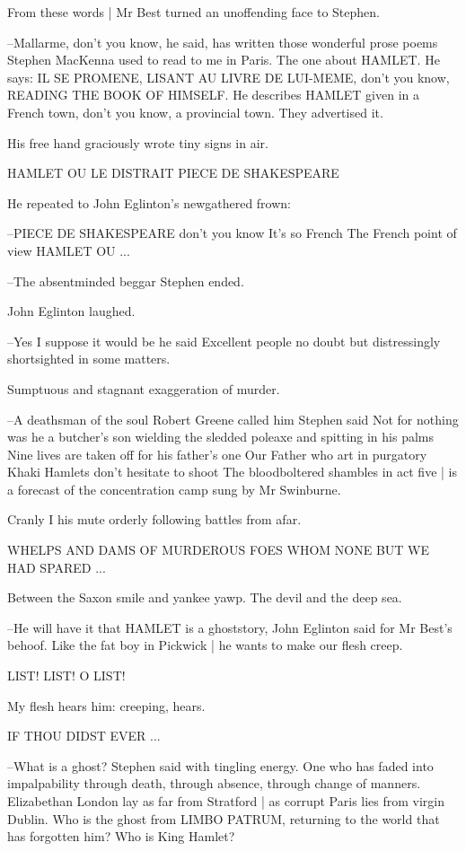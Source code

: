 From these words |
Mr Best turned an unoffending face to Stephen.

--Mallarme,
don't you know,
he said,
has written those wonderful prose poems
Stephen MacKenna used to read to me in Paris.
The one about HAMLET.
He says:
IL SE PROMENE,
LISANT AU LIVRE DE LUI-MEME,
don't you know,
READING THE BOOK OF HIMSELF.
He describes HAMLET given in a French town,
don't you know,
a provincial town.
They advertised it.

His free hand graciously wrote tiny signs in air.


    HAMLET
    OU
    LE DISTRAIT
    PIECE DE SHAKESPEARE


He repeated to John Eglinton's newgathered frown:

--PIECE DE SHAKESPEARE
don't you know
It's so French
The French point of view
HAMLET OU ...

--The absentminded beggar
Stephen ended.

John Eglinton laughed.

--Yes
I suppose it would be
he said
Excellent people
no doubt
but distressingly shortsighted in some matters.

Sumptuous and stagnant exaggeration of murder.

--A deathsman of the soul Robert Greene called him
Stephen said
Not for nothing was he a butcher's son
wielding the sledded poleaxe and spitting in his palms
Nine lives are taken off for his father's one
Our Father who art in purgatory
Khaki Hamlets don't hesitate to shoot
The bloodboltered shambles in act five |
is a forecast of the concentration camp sung by Mr Swinburne.

Cranly
I his mute orderly
following battles from afar.

    WHELPS AND DAMS OF MURDEROUS FOES WHOM NONE
    BUT WE HAD SPARED ...


Between the Saxon smile and yankee yawp.
The devil and the deep sea.

--He will have it that HAMLET is a ghoststory,
John Eglinton said for Mr Best's behoof.
Like the fat boy in Pickwick |
he wants to make our flesh creep.


    LIST! LIST! O LIST!


My flesh hears him:
creeping, hears.


    IF THOU DIDST EVER ...


--What is a ghost?
Stephen said with tingling energy.
One who has faded into impalpability through death,
through absence,
through change of manners.
Elizabethan London lay as far from Stratford |
as corrupt Paris lies from virgin Dublin.
Who is the ghost from LIMBO PATRUM,
returning to the world that has forgotten him?
Who is King Hamlet?

